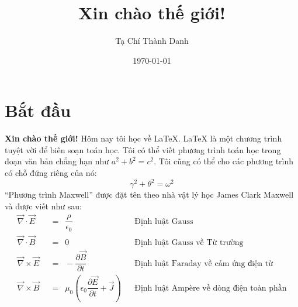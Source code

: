 \documentclass[a4paper,notitlepage]{article}
\title{Xin chào thế giới!}
\author{Tạ Chí Thành Danh}
\date{\today}
\begin{document}
	\maketitle
	\section{Bắt đầu}
	\textbf{Xin chào thế giới!} Hôm nay tôi học về \LaTeX. \LaTeX{} là một chương trình tuyệt vời để biên soạn toán học. Tôi có thể viết phương trình toán học trong đoạn văn bản chẳng hạn như $a^2 + b^2 = c^2$. Tôi cũng có thể cho các phương trình có chỗ đứng riêng của nó:
	\begin{equation}
		\gamma^2 + \theta^2 = \omega^2
	\end{equation}
	``Phương trình Maxwell'' được đặt tên theo nhà vật lý học James Clark Maxwell và được viết như sau:
	\begin{align} 
		\vec\nabla \cdot \vec E \enspace &= \enspace \dfrac{\rho}{\epsilon_0} && \text{Định luật Gauss} \label{eqn:2} \\
		\vec\nabla \cdot \vec B \enspace &= \enspace 0 && \text{Định luật Gauss về Từ trường} \label{eqn:3} \\
		\vec\nabla \times \vec E \enspace &= \enspace -\dfrac{\partial \vec B}{\partial t} && \text{Định luật Faraday về cảm ứng điện từ} \label{eqn:4} \\
		\vec\nabla \times \vec B \enspace &= \enspace \mu_0 \left(\epsilon_0 \dfrac{\partial \vec E}{\partial t} + \vec J\right) && \text{Định luật Ampère về dòng điện toàn phần} \label{eqn:5}
	\end{align}
\end{document}
